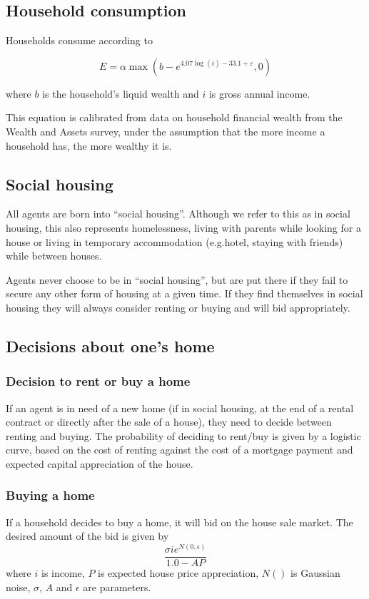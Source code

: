 \documentclass{article}
\begin{document}
\subsection{Household consumption}

Households consume according to

\begin{equation}
E=\alpha \max \left( b-e^{4.07\log (i)-33.1+\varepsilon },0\right)
\end{equation}

\bigskip

where $b$ is the household's liquid wealth and $i$ is gross annual income.

This equation is calibrated from data on household financial wealth from the
Wealth and Assets survey, under the assumption that the more income a
household has, the more wealthy it is.

\bigskip

\subsection{Social housing}
All agents are born into ``social housing''. Although we refer to this as in social housing, this also represents homelessness, living with parents while looking for a house or living in temporary accommodation (e.g.hotel, staying with friends) while between houses.

Agents never choose to be in ``social housing'', but are put there if they fail to secure any other form of housing at a given time. If they find themselves in social housing they will always consider renting or buying and will bid appropriately.

\subsection{Decisions about one's home}
\subsubsection{Decision to rent or buy a home}
If an agent is in need of a new home (if in social housing, at the end of a rental contract or directly after the sale of a house), they need to decide between renting and buying. The probability of deciding to rent/buy is given by a logistic curve, based on the cost of renting against the cost of a mortgage payment and expected capital appreciation of the house.

\subsubsection{Buying a home}
If a household decides to buy a home, it will bid on the house sale market. The desired amount of the bid is given by
\[
 \frac{\sigma i e^{N(0,\epsilon)}}{1.0 - AP}
\]
where $i$ is income, $P$ is expected house price appreciation, $N()$ is Gaussian noise, $\sigma$, $A$ and $\epsilon$ are parameters.
\end{document}

